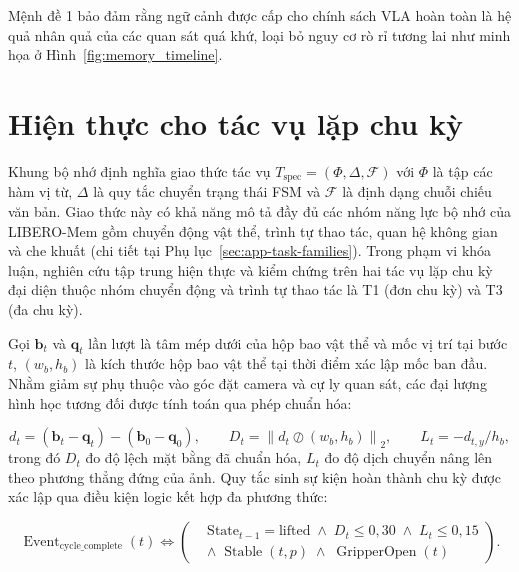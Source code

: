 Mệnh đề 1 bảo đảm rằng ngữ cảnh được cấp cho chính sách VLA hoàn toàn là hệ quả nhân quả của các quan sát quá khứ, loại bỏ nguy cơ rò rỉ tương lai như minh họa ở Hình~\ref{fig:memory_timeline}.

\section{Hiện thực cho tác vụ lặp chu kỳ}

Khung bộ nhớ định nghĩa giao thức tác vụ $T_{\mathrm{spec}} = (\Phi, \Delta, \mathcal{F})$ với $\Phi$ là tập các hàm vị từ, $\Delta$ là quy tắc chuyển trạng thái FSM và $\mathcal{F}$ là định dạng chuỗi chiếu văn bản. Giao thức này có khả năng mô tả đầy đủ các nhóm năng lực bộ nhớ của LIBERO-Mem gồm chuyển động vật thể, trình tự thao tác, quan hệ không gian và che khuất (chi tiết tại Phụ lục~\ref{sec:app-task-families}). Trong phạm vi khóa luận, nghiên cứu tập trung hiện thực và kiểm chứng trên hai tác vụ lặp chu kỳ đại diện thuộc nhóm chuyển động và trình tự thao tác là T1 (đơn chu kỳ) và T3 (đa chu kỳ).

Gọi $\mathbf b_t$ và $\mathbf q_t$ lần lượt là tâm mép dưới của hộp bao vật thể và mốc vị trí tại bước $t$, $(w_b, h_b)$ là kích thước hộp bao vật thể tại thời điểm xác lập mốc ban đầu. Nhằm giảm sự phụ thuộc vào góc đặt camera và cự ly quan sát, các đại lượng hình học tương đối được tính toán qua phép chuẩn hóa:

\begin{equation}
d_t = (\mathbf b_t - \mathbf q_t) - (\mathbf b_0 - \mathbf q_0),\qquad
D_t = \left\| d_t \oslash (w_b, h_b) \right\|_2,\qquad
L_t = -d_{t,y} / h_b,
\label{eq:case-study-geometry}
\end{equation}
trong đó $D_t$ đo độ lệch mặt bằng đã chuẩn hóa, $L_t$ đo độ dịch chuyển nâng lên theo phương thẳng đứng của ảnh. Quy tắc sinh sự kiện hoàn thành chu kỳ được xác lập qua điều kiện logic kết hợp đa phương thức:

\begin{equation}
\operatorname{Event}_{\mathrm{cycle\_complete}}(t) \iff
\left(
\begin{aligned}
&\text{State}_{t-1} = \text{lifted} \;\land\; D_t \le 0{,}30 \;\land\; L_t \le 0{,}15 \\
&\land\; \operatorname{Stable}(t, p) \;\land\; \operatorname{GripperOpen}(t)
\end{aligned}
\right).
\label{eq:event-rule-instantiation}
\end{equation}

